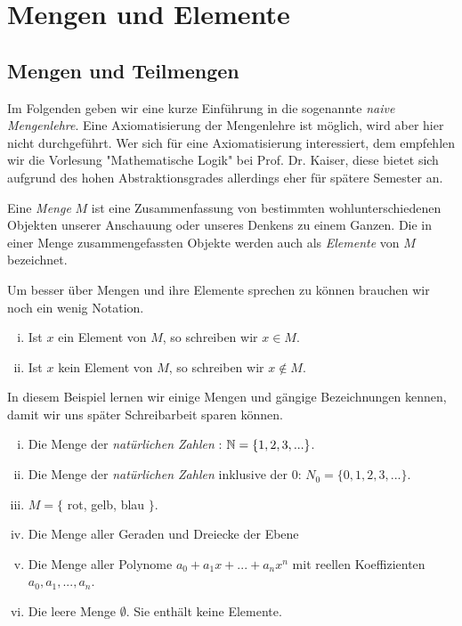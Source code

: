 \chapter{Mengen und Elemente}

\section{Mengen und Teilmengen}
Im Folgenden geben wir eine kurze Einführung in die sogenannte \textit{naive Mengenlehre}. Eine Axiomatisierung der Mengenlehre ist möglich, wird aber hier nicht durchgeführt. 
Wer sich für eine Axiomatisierung interessiert, dem empfehlen wir die Vorlesung "Mathematische Logik" bei Prof. Dr. Kaiser, diese bietet sich aufgrund des hohen Abstraktionsgrades allerdings eher für spätere Semester an. 

\begin{mydef}
    Eine \textit{Menge} $M$ ist eine Zusammenfassung von bestimmten wohlunterschiedenen Objekten unserer Anschauung oder unseres Denkens zu einem Ganzen. 
    Die in einer Menge zusammengefassten Objekte werden auch als \textit{Elemente} von $M$ bezeichnet. 
\end{mydef}

\begin{remark}
    Um besser über Mengen und ihre Elemente sprechen zu können brauchen wir noch ein wenig Notation. 
    \begin{enumerate}[(i)]
        \item 
        Ist $x$ ein Element von $M$, so schreiben wir $x \in M$. 
        \item 
        Ist $x$ kein Element von $M$, so schreiben wir $x \notin M$. 
    \end{enumerate}
\end{remark}

\begin{example}
    In diesem Beispiel lernen wir einige Mengen und gängige Bezeichnungen kennen, damit wir uns später Schreibarbeit sparen können. 
    \begin{enumerate}[(i)]
        \item 
        Die Menge der \textit{natürlichen Zahlen} : $\mathbb{N} = \{1,2,3,...\}$.
        \item 
        Die Menge der \textit{natürlichen Zahlen} inklusive der $0$: $N_0 = \{0,1,2,3,...\}$. 
        \item 
        $M = \{$ rot, gelb, blau $\}$. 
        \item 
        Die Menge aller Geraden und Dreiecke der Ebene
        \item 
        Die Menge aller Polynome $a_0 + a_1 x + ... + a_n x^n$ mit reellen Koeffizienten $a_0,a_1,...,a_n$. 
        \item 
        Die leere Menge $\emptyset$. Sie enthält keine Elemente. 
    \end{enumerate}
\end{example}

